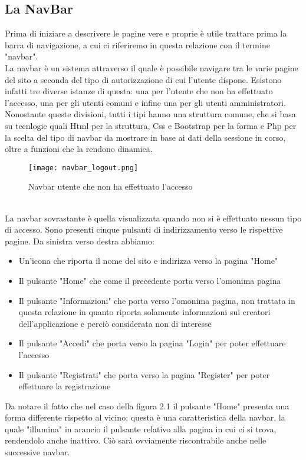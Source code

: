 \documentclass[binding=0.6cm, oneside, noexaminfo, italian]{sapthesis}
\begin{document}
\subsection{La NavBar}
Prima di iniziare a descrivere le pagine vere e proprie è utile trattare prima la barra di navigazione, a cui ci riferiremo in questa relazione con il termine "navbar". \\
La navbar è un sistema attraverso il quale è possibile navigare tra le varie pagine del sito a seconda del tipo di autorizzazione di cui l'utente dispone. Esistono infatti tre diverse istanze di questa: una per l'utente che non ha effettuato l'accesso, una per gli utenti comuni e infine una per gli utenti amministratori.
Nonostante queste divisioni, tutti i tipi hanno una struttura comune, che si basa su tecnlogie quali Html per la struttura, Css e Bootstrap per la forma e Php per la scelta del tipo di navbar da mostrare in base ai dati della sessione in corso, oltre a funzioni che la rendono dinamica. \\
\begin{figure}[h]
    \centering
    \texttt{[image: navbar\_logout.png]}
    \caption{Navbar utente che non ha effettuato l'accesso}
    \label{fig:navbar_logout}
\end{figure} \\
La navbar sovrastante è quella visualizzata quando non si è effettuato nessun tipo di accesso. Sono presenti cinque pulsanti di indirizzamento verso le rispettive pagine. Da sinistra verso destra abbiamo:
\begin{itemize}
    \item Un'icona che riporta il nome del sito e indirizza verso la pagina "Home"
    \item Il pulsante "Home" che come il precedente porta verso l'omonima pagina
    \item Il pulsante "Informazioni" che porta verso l'omonima pagina, non trattata in questa relazione in quanto riporta solamente informazioni sui creatori dell'applicazione e perciò considerata non di interesse
    \item Il pulsante "Accedi" che porta verso la pagina "Login" per poter effettuare l'accesso
    \item Il pulsante "Registrati" che porta verso la pagina "Register" per poter effettuare la registrazione
\end{itemize}
Da notare il fatto che nel caso della figura 2.1 il pulsante "Home" presenta una forma differente rispetto al vicino; questa è una caratteristica della navbar, la quale "illumina" in arancio il pulsante relativo alla pagina in cui ci si trova, rendendolo anche inattivo. Ciò sarà ovviamente riscontrabile anche nelle successive navbar. \\
\end{document}
